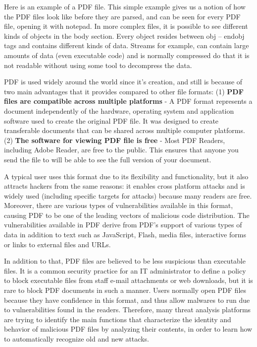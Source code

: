 \documentclass{article}
\begin{document}
\indent Here \cite{1} is an example of a PDF file. This simple example gives us a notion of how the PDF files look like before they are parsed, and can be seen for every PDF file, opening it with notepad. In more complex files, it is possible to see different kinds of objects in the body section. Every object resides between obj – endobj tags and contains different kinds of data. Streams for example, can contain large amounts of data (even executable code) and is normally compressed do that it is not readable without using some tool to decompress the data.

\indent PDF is used widely around the world since it’s creation, and still is because of two main advantages that it provides compared to other file formats: (1) \textbf{PDF files are compatible across multiple platforms} - A PDF format represents a document independently of the hardware, operating system and application software used to create the original PDF file. It was designed to create transferable documents that can be shared across multiple computer platforms. (2) \textbf{The software for viewing PDF file is free} - Most PDF Readers, including Adobe Reader, are free to the public.  This ensures that anyone you send the file to will be able to see the full version of your document.

\indent A typical user uses this format due to its flexibility and functionality, but it also attracts hackers from the same reasons: it enables cross platform attacks and is widely used (including specific targets for attacks) because many readers are free. Moreover, there are various types of vulnerabilities available in this format, causing PDF to be one of the leading vectors of malicious code distribution. The vulnerabilities available in PDF derive from PDF’s support of various types of data in addition to text such as JavaScript, Flash, media files, interactive forms or links to external files and URLs.

\indent In addition to that, PDF files are believed to be less suspicious than executable files. It is a common security practice for an IT administrator to define a policy to block executable files from staff e-mail attachments or web downloads, but it is rare to block PDF documents in such a manner. Users normally open PDF files because they have confidence in this format, and thus allow malwares to run due to vulnerabilities found in the readers. Therefore, many threat analysis platforms are trying to identify the main functions that characterize the identity and behavior of malicious PDF files by analyzing their contents, in order to learn how to automatically recognize old and new attacks.
\end{document}
